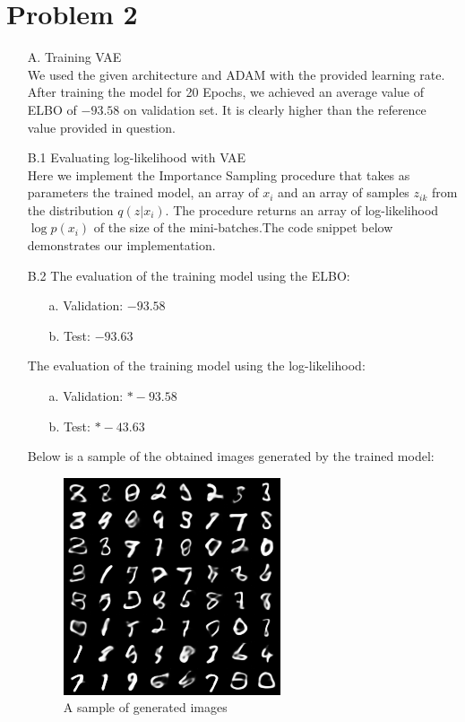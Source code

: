 \section*{Problem 2}
\begin{itemize}
     \item[A.]{Training VAE}\\
     We used the given architecture and ADAM with the provided learning rate. After training the model for 20 Epochs, we achieved an average value of ELBO of $-93.58$ on validation set. It is clearly higher than the reference value provided in question.  
     
     \item[B.1]{Evaluating log-likelihood with VAE}\\
     Here we implement the Importance Sampling procedure that takes as parameters the trained model, an array of $x_i$ and an array of samples $z_{ik}$ from the distribution $q(z|x_i)$. The procedure returns an array of log-likelihood $\log p(x_i)$  of the size of the mini-batches.The code snippet below demonstrates our implementation. 
     
     
     
     \item[B.2]
     The evaluation of the training model using the ELBO:
     \begin{itemize}
         \item [a.] Validation: $-93.58$
         \item [b.] Test: $-93.63$
     \end{itemize}
     The evaluation of the training model using the log-likelihood:
     \begin{itemize}
         \item [a.] Validation: $*-93.58$
         \item [b.] Test: $*-43.63$
     \end{itemize}
     Below is a sample of the obtained images generated by the trained model:
\begin{figure}
\centering
  \includegraphics[scale=1]{sample_19.png}
  \caption{A sample of generated images}
  \label{fig:gen_sample}
\end{figure}
\end{itemize}
